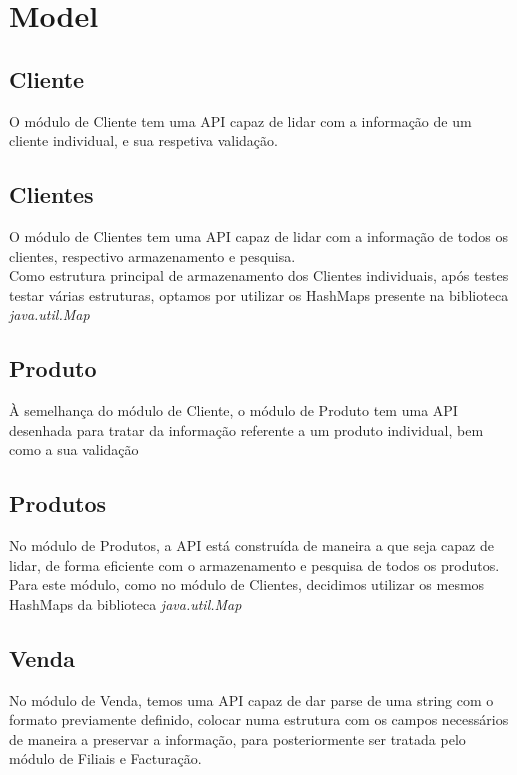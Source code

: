 \documentclass[a4paper]{report}
\begin{document}
\section{Model}

\subsection{Cliente}

O módulo de Cliente tem uma API capaz de lidar com a informação de um cliente
individual, e sua respetiva validação. 

\subsection{Clientes}

O módulo de Clientes tem uma API capaz de lidar com a informação de todos os
clientes, respectivo armazenamento e pesquisa. \\ 
Como estrutura principal de armazenamento dos Clientes individuais, após testes 
testar várias estruturas, optamos por utilizar os HashMaps presente na biblioteca
\textit{java.util.Map}

\subsection{Produto}

À semelhança do módulo de Cliente, o módulo de Produto tem uma API desenhada
para tratar da informação referente a um produto individual, bem como a sua 
validação

\subsection{Produtos}

No módulo de Produtos, a API está construída de maneira a que seja capaz de
lidar, de forma eficiente com o armazenamento e pesquisa de todos os produtos.\\
Para este módulo, como no módulo de Clientes, decidimos utilizar os mesmos HashMaps
da biblioteca \textit{java.util.Map}

\subsection{Venda}

No módulo de Venda, temos uma API capaz de dar parse de uma string com o formato 
previamente definido, colocar numa estrutura com os campos necessários de maneira
a preservar a informação, para posteriormente ser tratada pelo módulo de Filiais e
Facturação.
\end{document}
